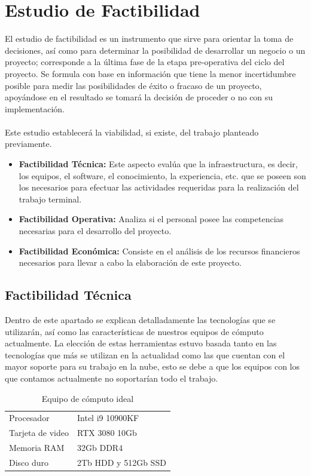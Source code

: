 \documentclass[12pt, a4paper, titlepage]{report}
\begin{document}
    	\section{Estudio de Factibilidad}
    	El estudio de factibilidad es un instrumento que sirve para orientar la toma de decisiones, así como para determinar la posibilidad de desarrollar un negocio o un proyecto; corresponde a la última fase de la etapa pre-operativa del ciclo del proyecto. Se formula con base en información que tiene la menor incertidumbre posible para medir las posibilidades de éxito o fracaso de un proyecto, apoyándose en el resultado se tomará la decisión de proceder o no con su implementación.\\\\ 
    	Este estudio establecerá la viabilidad, si existe, del trabajo planteado previamente.
    	\begin{itemize}
    		\item \textbf{Factibilidad Técnica:} Este aspecto evalúa que la infraestructura, es decir, los equipos, el software, el conocimiento, la experiencia, etc. que se poseen son los necesarios para efectuar las actividades requeridas para la realización del trabajo terminal.
    		\item \textbf{Factibilidad Operativa:} Analiza si el personal posee las competencias necesarias para el desarrollo del proyecto.
    		\item \textbf{Factibilidad Econ\'omica:} Consiste en el análisis de los recursos financieros necesarios para llevar a cabo la elaboraci\'on de este proyecto.
    	\end{itemize}
    	\subsection{Factibilidad Técnica}
    	
    	Dentro de este apartado se explican detalladamente las tecnologías que se utilizarán, así como las características de nuestros equipos de cómputo actualmente. La elección de estas herramientas estuvo basada tanto en las tecnologías que más se utilizan en la actualidad como las que cuentan con el mayor soporte para su trabajo en la nube, esto se debe a que los equipos con los que contamos actualmente no soportarían todo el trabajo.
    	    	
    	\begin{table}[H]
    		\begin{tabular}{|p{3.5cm}||p{10cm}|}
    			\rowcolor{guindapoli}
    			\multicolumn{2}{|c|}{\textbf{\textcolor{white}{Equipo de cómputo ideal.}}}\\
    			\hline
    			\rowcolor{azulclaro}Procesador & Intel i9 10900KF\\
    			\hline
    			\rowcolor{white}Tarjeta de video & RTX 3080 10Gb\\
    			\hline
    			\rowcolor{azulclaro}Memoria RAM & 32Gb DDR4\\
    			\hline
    			\rowcolor{white}Disco duro & 2Tb HDD y 512Gb SSD\\
    			\hline
    		\end{tabular}
    		\caption[Equipo de cómputo ideal]{Equipo de cómputo ideal}
    	\end{table}
    	
\end{document}
